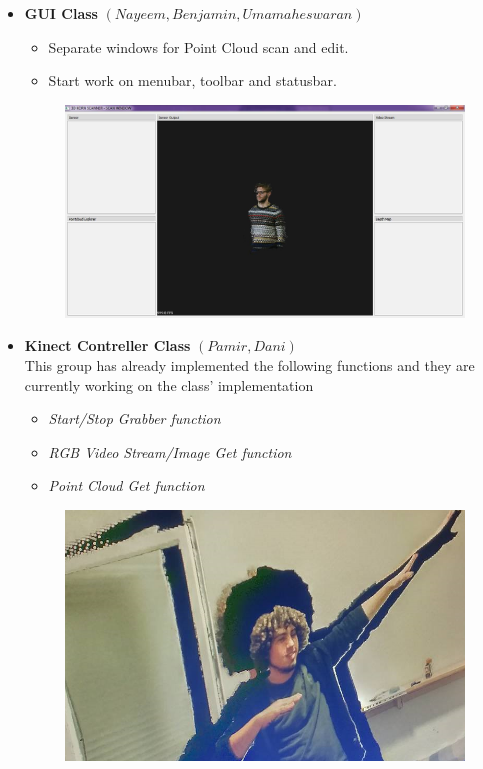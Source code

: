 \documentclass[11pt]{article} %
\begin{document}
\begin{itemize}
	\item \textbf{GUI Class} $(Nayeem,Benjamin,Umamaheswaran)$
		\begin{itemize}
			\item Separate windows for Point Cloud scan and edit.
			\item Start work on menubar, toolbar and statusbar.
		\end{itemize}
\begin{figure}[H]
        \centering
		\includegraphics[scale = 0.3]{GUI1.png} 
		
	
	
\end{figure}
		
	
	
	
	\item \textbf{Kinect Contreller Class} $(Pamir,Dani)$\\
	This group has already implemented the following functions and they are currently working on the class' implementation
	\begin{itemize}
		\item \textit{Start/Stop Grabber function} 
		\item \textit{RGB Video Stream/Image Get function}
		\item \textit{Point Cloud Get function}
	\end{itemize}
	
	\begin{figure}[H]
		\centering
		\includegraphics[width = 0.65\columnwidth]{Kinect.png} 
	\end{figure}
	
	
\end{itemize}
\end{document}
